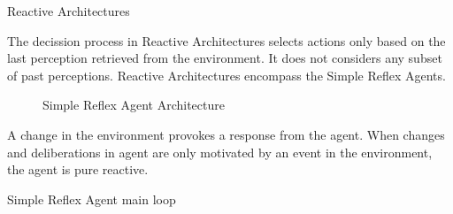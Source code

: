 \documentclass[11pt,oneside,a4paper,openright]{report}
\begin{document}
\begin{description} %
	\item Reactive Architectures

The decission process in Reactive Architectures selects actions only based on the last perception retrieved
from the environment. It does not considers any subset of past perceptions. Reactive Architectures encompass  
the Simple Reflex Agents.

		\begin{figure}[h]
		\centering
		\setlength\fboxsep{0pt}
		\setlength\fboxrule{0.5pt}
		\caption{Simple Reflex Agent Architecture}
		\label{fig:SimpleReflexArchitect0_label}
		\end{figure}

A change in the environment provokes a response from the agent. When changes and deliberations in agent are
only motivated by an event in the environment, the agent is pure reactive.\\
	
		\begin{algorithm}[h]
		\SetAlgoLined
		\BlankLine
		\caption{Simple Reflex Agent main loop}
		\end{algorithm}

	\begin{itemize}


\end{itemize}
\end{description}
\end{document}
